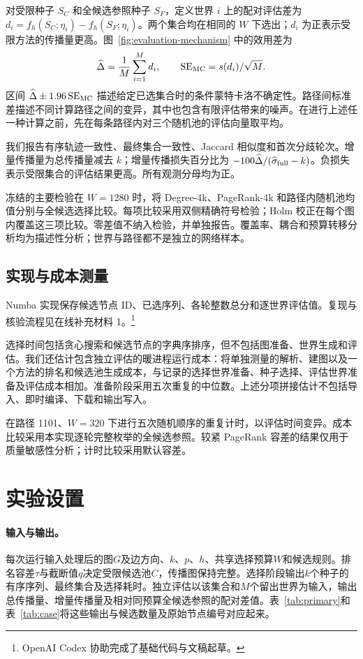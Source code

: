 \documentclass[smallextended]{svjour3}
\begin{document}
对受限种子 $S_C$ 和全候选参照种子 $S_F$，定义世界 $i$ 上的配对评估差为 $d_i=f_h(S_C;\eta_i)-f_h(S_F;\eta_i)$。两个集合均在相同的 $W$ 下选出；$d_i$ 为正表示受限方法的传播量更高。图~\ref{fig:evaluation-mechanism} 中的效用差为
\begin{equation}
\widehat\Delta=\frac{1}{M}\sum_{i=1}^{M}d_i,
\qquad \operatorname{SE}_{\rm MC}=s(d_i)/\sqrt M.
\end{equation}
区间 $\widehat\Delta\pm1.96\operatorname{SE}_{\rm MC}$ 描述给定已选集合时的条件蒙特卡洛不确定性。路径间标准差描述不同计算路径之间的变异，其中也包含有限评估带来的噪声。在进行上述任一种计算之前，先在每条路径内对三个随机池的评估向量取平均。

我们报告有序轨迹一致性、最终集合一致性、Jaccard 相似度和首次分歧轮次。增量传播量为总传播量减去 $k$；增量传播损失百分比为 $-100\widehat\Delta/(\widehat\sigma_{\rm full}-k)$。负损失表示受限集合的评估结果更高。所有观测分母均为正。

冻结的主要检验在 $W=1280$ 时，将 Degree-4k、PageRank-4k 和路径内随机池均值分别与全候选选择比较。每项比较采用双侧精确符号检验；Holm 校正在每个图内覆盖这三项比较。零差值不纳入检验，并单独报告。覆盖率、耦合和预算转移分析均为描述性分析；世界与路径都不是独立的网络样本。

\subsection{实现与成本测量}
Numba 实现保存候选节点 ID、已选序列、各轮整数总分和逐世界评估值。复现与核验流程见在线补充材料 1。\footnote{OpenAI Codex 协助完成了基础代码与文稿起草。}

选择时间包括贪心搜索和候选节点的字典序排序，但不包括图准备、世界生成和评估。我们还估计包含独立评估的暖进程运行成本：将单独测量的解析、建图以及一个方法的排名和候选池生成成本，与记录的选择世界准备、种子选择、评估世界准备及评估成本相加。准备阶段采用五次重复的中位数。上述分项拼接估计不包括导入、即时编译、下载和输出写入。

在路径 1101、$W=320$ 下进行五次随机顺序的重复计时，以评估时间变异。成本比较采用本实现逐轮完整枚举的全候选参照。较紧 PageRank 容差的结果仅用于质量敏感性分析；计时比较采用默认容差。

\section{实验设置}\label{sec:experimental-setup}
\paragraph{输入与输出。}每次运行输入处理后的图$G$及边方向、$k$、$p$、$h$、共享选择预算$W$和候选规则。排名容差$\tau$与截断值$q$决定受限候选池$C$，传播图保持完整。选择阶段输出$k$个种子的有序序列、最终集合及选择耗时。独立评估以该集合和$M$个留出世界为输入，输出总传播量、增量传播量及相对同预算全候选参照的配对差值。表~\ref{tab:primary}和表~\ref{tab:case}将这些输出与候选数量及原始节点编号对应起来。
\end{document}
